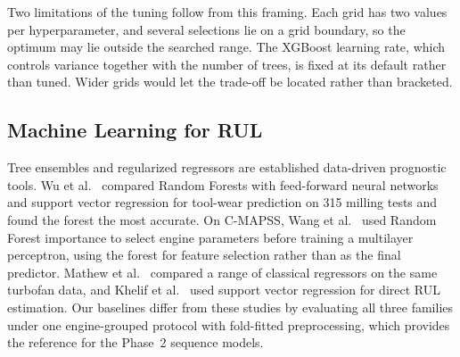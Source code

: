 Two limitations of the tuning follow from this framing. Each grid has two
values per hyperparameter, and several selections lie on a grid boundary, so
the optimum may lie outside the searched range. The XGBoost learning rate,
which controls variance together with the number of trees, is fixed at its
default rather than tuned. Wider grids would let the trade-off be located
rather than bracketed.

\subsection{Machine Learning for RUL}
Tree ensembles and regularized regressors are established data-driven
prognostic tools. Wu et al.~\cite{Wu2017comparative} compared Random Forests
with feed-forward neural networks and support vector regression for tool-wear
prediction on 315 milling tests and found the forest the most accurate.
On C-MAPSS, Wang et al.~\cite{Wang2023remaining} used Random Forest importance
to select engine parameters before training a multilayer perceptron, using the
forest for feature selection rather than as the final predictor.
Mathew et al.~\cite{Mathew2017prediction} compared a range of classical
regressors on the same turbofan data, and Khelif
et al.~\cite{Khelif2017direct} used support vector regression for direct RUL
estimation. Our baselines differ from these studies by evaluating all three
families under one engine-grouped protocol with fold-fitted preprocessing,
which provides the reference for the Phase~2 sequence models.
